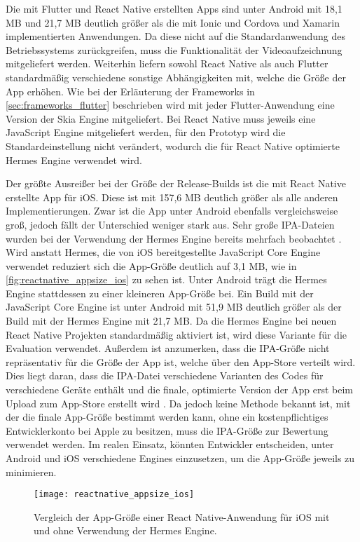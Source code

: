 Die mit Flutter und React Native erstellten Apps sind unter Android mit 18,1 MB und 21,7 MB deutlich größer als die mit Ionic und Cordova und Xamarin implementierten Anwendungen.
Da diese nicht auf die Standardanwendung des Betriebssystems zurückgreifen, muss die Funktionalität der Videoaufzeichnung mitgeliefert werden.
Weiterhin liefern sowohl React Native als auch Flutter standardmäßig verschiedene sonstige Abhängigkeiten mit, welche die Größe der App erhöhen.
Wie bei der Erläuterung der Frameworks in \autoref{sec:frameworks_flutter} beschrieben wird mit jeder Flutter-Anwendung eine Version der Skia Engine mitgeliefert.
Bei React Native muss jeweils eine JavaScript Engine mitgeliefert werden, für den Prototyp wird die Standardeinstellung nicht verändert, wodurch die für React Native optimierte Hermes Engine verwendet wird.

Der größte Ausreißer bei der Größe der Release-Builds ist die mit React Native erstellte App für iOS.
Diese ist mit 157,6 MB deutlich größer als alle anderen Implementierungen.
Zwar ist die App unter Android ebenfalls vergleichsweise groß, jedoch fällt der Unterschied weniger stark aus.
Sehr große \ac{IPA}-Dateien wurden bei der Verwendung der Hermes Engine bereits mehrfach beobachtet \cite{Hermes_appsize,Hermes_appsize_2}.
Wird anstatt Hermes, die von iOS bereitgestellte JavaScript Core Engine verwendet reduziert sich die App-Größe deutlich auf 3,1 MB, wie in \autoref{fig:reactnative_appsize_ios} zu sehen ist.
Unter Android trägt die Hermes Engine stattdessen zu einer kleineren App-Größe bei.
Ein Build mit der JavaScript Core Engine ist unter Android mit 51,9 MB deutlich größer als der Build mit der Hermes Engine mit 21,7 MB.
Da die Hermes Engine bei neuen React Native Projekten standardmäßig aktiviert ist, wird diese Variante für die Evaluation verwendet.
Außerdem ist anzumerken, dass die \ac{IPA}-Größe nicht repräsentativ für die Größe der App ist, welche über den App-Store verteilt wird.
Dies liegt daran, dass die \ac{IPA}-Datei verschiedene Varianten des Codes für verschiedene Geräte enthält und die finale, optimierte Version der App erst beim Upload zum App-Store erstellt wird \cite{IPA_Size}.
Da jedoch keine Methode bekannt ist, mit der die finale App-Größe bestimmt werden kann, ohne ein kostenpflichtiges Entwicklerkonto bei Apple zu besitzen, muss die \ac{IPA}-Größe zur Bewertung verwendet werden.
Im realen Einsatz, könnten Entwickler entscheiden, unter Android und iOS verschiedene Engines einzusetzen, um die App-Größe jeweils zu minimieren.

\begin{figure}[ht]
  \centering 
  \texttt{[image: reactnative\_appsize\_ios]}
   \caption{Vergleich der App-Größe einer React Native-Anwendung für iOS mit und ohne Verwendung der Hermes Engine.}
  \label{fig:reactnative_appsize_ios}
\end{figure}


